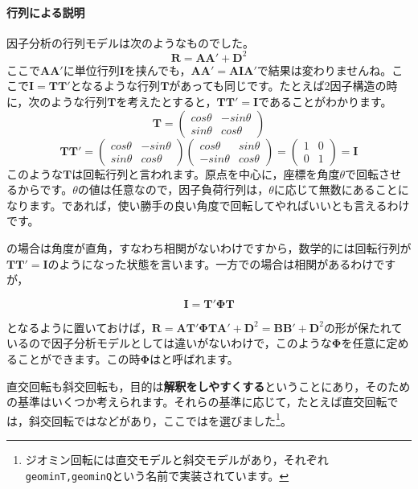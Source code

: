 \documentclass{ltjsbook}
\begin{document}
\paragraph{行列による説明}
因子分析の行列モデルは次のようなものでした。
\[ \bm{R}= \bm{AA'}+\bm{D}^2 \]
ここで$\bm{AA'}$に単位行列$\bm{I}$を挟んでも，$\bm{AA'}=\bm{AIA'}$で結果は変わりませんね。ここで$\bm{I} = \bm{TT'}$となるような行列$\bm{T}$があっても同じです。たとえば2因子構造の時に，次のような行列$\bm{T}$を考えたとすると，$\bm{TT'}=\bm{I}$であることがわかります。
\[
	\bm{T} = \begin{pmatrix} cos \theta & -sin \theta \\ sin \theta & cos\theta \end{pmatrix}
\]
\[
	\bm{TT'}=\begin{pmatrix} cos \theta & -sin \theta \\ sin \theta & cos\theta \end{pmatrix}
	\begin{pmatrix} cos \theta & sin \theta \\ -sin \theta & cos\theta \end{pmatrix}
	=\begin{pmatrix} 1 & 0 \\ 0 & 1 \end{pmatrix} =\bm{I}
\]
このような$\bm{T}$は回転行列と言われます。原点を中心に，座標を角度$\theta$で回転させるからです。$\theta$の値は任意なので，因子負荷行列は，$\theta$に応じて無数にあることになります。であれば，使い勝手の良い角度で回転してやればいいとも言えるわけです。

の場合は角度が直角，すなわち相関がないわけですから，数学的には回転行列が$\bm{TT'}=\bm{I}$のようになった状態を言います。一方での場合は相関があるわけですが，

\[ \bm{I} = \bm{T'\Phi T}\]

となるように置いておけば，$\bm{R} = \bm{AT'\Phi TA'}+\bm{D}^2=\bm{BB'}+\bm{D}^2$の形が保たれているので因子分析モデルとしては違いがないわけで，このような$\bm{\Phi}$を任意に定めることができます。この時$\bm{\Phi}$はと呼ばれます。

直交回転も斜交回転も，目的は\textbf{解釈をしやすくする}ということにあり，そのための基準はいくつか考えられます。それらの基準に応じて，たとえば直交回転では，斜交回転ではなどがあり，ここではを選びました\footnote{ジオミン回転には直交モデルと斜交モデルがあり，それぞれ\verb|geominT,geominQ|という名前で実装されています。}。
\end{document}

